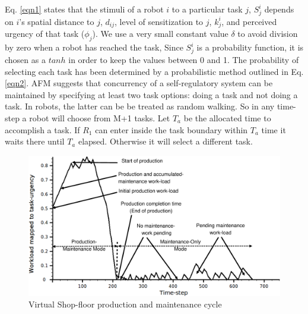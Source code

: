 \documentclass{llncs}
\begin{document}
Eq. \ref{eqn1} states that the stimuli of a robot $i$ to a particular task $j$, $S_{j}^{i}$ depends on $i$'s spatial distance to $j$, $d_{ij}$, level of sensitization to $j$, $k_{j}^{i}$, and perceived urgency of that task ($\phi _{j}$). We use a very small constant value $\delta$ to avoid division by zero when a robot has reached the task, Since $S_{j}^{i}$ is a probability function, it is chosen as a $tanh$ in order
to keep the values between 0 and 1. The probability of selecting each task has been determined by a probabilistic method outlined in Eq. \ref{eqn2}.
AFM suggests that concurrency of a self-regulatory system can be maintained by specifying at least two task options: doing a task and not doing a task. In robots, the latter can be be treated as random walking. So in any time-step a robot will choose from M+1 tasks. Let $T_a$ be the allocated time to accomplish a task. If $R_1$ can enter inside the task boundary within $T_a$ time it waits there until $T_a$ elapsed. Otherwise it will select a different task.
\begin{figure}
\centering
\includegraphics[width=12cm, angle=0]
{./images/VSP.eps}
\caption{\small Virtual Shop-floor production and maintenance cycle}
\label{fig:vsp}  %
\end{figure}
\end{document}
